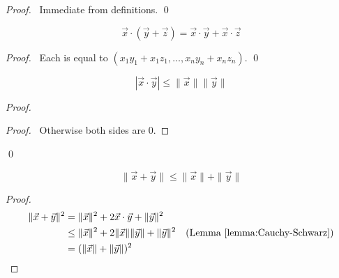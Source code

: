 \begin{proof}
    \pf\ Immediate from definitions. \qed
\end{proof}

\begin{lemma}
    \[ \vec{x} \cdot (\vec{y} + \vec{z}) = \vec{x} \cdot \vec{y} + \vec{x} \cdot \vec{z} \]
\end{lemma}

\begin{proof}
    \pf\ Each is equal to $(x_1 y_1 + x_1 z_1, \ldots, x_n y_n + x_n z_n)$. \qed
\end{proof}

\begin{lemma}
    \label{lemma:Cauchy-Schwarz}
    \[ |\vec{x} \cdot \vec{y}| \leq \| \vec{x} \| \| \vec{y} \| \]
\end{lemma}

\begin{proof}
    \pf
    \begin{proof}
        \pf\ Otherwise both sides are 0.
    \end{proof}
    \qed
\end{proof}

\begin{lemma}
    \label{lemma:triangle_inequality}
    \[ \| \vec{x} + \vec{y} \| \leq \| \vec{x} \| + \| \vec{y} \| \]
\end{lemma}

\begin{proof}
    \pf
    \begin{align*}
        \| \vec{x} + \vec{y} \|^2 & = \| \vec{x} \|^2 + 2 \vec{x} \cdot \vec{y} + \| \vec{y} \|^2 \\
        & \leq \| \vec{x} \|^2 + 2 \| \vec{x} \| \| \vec{y} \| + \| \vec{y} \|^2 & (\text{Lemma \ref{lemma:Cauchy-Schwarz}}) \\
        & = (\| \vec{x} \| + \| \vec{y} \|)^2 & \qed
    \end{align*}
\end{proof}

